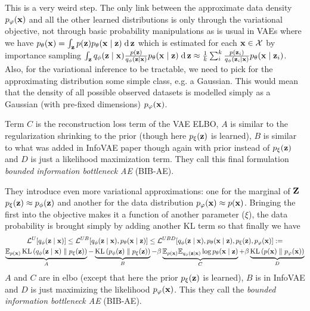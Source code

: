 \begin{notebox}
This is a very weird step. The only link between the approximate data density $p_\varphi(\mathbf{x})$ and all the other learned distributions is only through the variational objective, not through basic probability manipulations as is usual in VAEs where we have $p_\theta(\mathbf{x}) = \int_{\mathbf{z}} p(\mathbf{z}) p_\theta( \mathbf{x} \mid \mathbf{z}) \; \text{d} \, \mathbf{z}$ which is estimated for each $\mathbf{x} \in \mathcal{X}$ by importance sampling $\int_{\mathbf{z}} q_\phi( \mathbf{z} \mid \mathbf{x}) \frac{p(\mathbf{z})}{q_\phi( \mathbf{z} \mid \mathbf{x})} p_\theta( \mathbf{x} \mid \mathbf{z}) \; \text{d} \, \mathbf{z} \approx \frac{1}{k} \sum_i^k \frac{p(\mathbf{z}_i)}{q_\phi(\mathbf{z}_i \mid \mathbf{x})} p_\theta(\mathbf{x} \mid \mathbf{z}_i)$.
Also, for the variational inference to be tractable, we need to pick for the approximating distribution some simple class, e.g. a Gaussian. This would mean that the density of all possible observed datasets is modelled simply as a Gaussian (with pre-fixed dimensions) $p_\varphi(\mathbf{x})$.
\end{notebox}

Term $C$ is the reconstruction loss term of the VAE ELBO, $A$ is similar to the regularization shrinking to the prior (though here $p_\xi(\mathbf{z})$ is learned), $B$ is similar to what was added in InfoVAE paper \parencite{zhaoInfoVAEInformationMaximizing2017} though again with prior instead of $p_\xi(\mathbf{z})$ and $D$ is just a likelihood maximization term.
They call this final formulation \emph{bounded information bottleneck AE} (BIB-AE).


\begin{notebox}
\tldr They introduce even more variational approximations: one for the marginal of $\mathbf{Z}$ $p_\xi(\mathbf{z}) \approx p_\phi(\mathbf{z})$ and another for the data distribution $p_\varphi(\mathbf{x}) \approx p(\mathbf{x})$.
Bringing the first into the objective makes it a function of another parameter ($\xi$), the data probability is brought simply by adding another KL term so that finally we have 
\begin{gather}
\mathcal{L}^{U}[q_\phi( \mathbf{z} \mid \mathbf{x})] \leq \mathcal{L}^{UB}[q_\phi( \mathbf{z} \mid \mathbf{x}), p_\theta( \mathbf{x} \mid \mathbf{z})] \leq \mathcal{L}^{UBD}[q_\phi( \mathbf{z} \mid \mathbf{x}), p_\theta( \mathbf{x} \mid \mathbf{z}), p_\xi(\mathbf{z}), p_\varphi(\mathbf{x})] := \nonumber \\
\underbrace{\mathbb{E}_{p(\mathbf{x})} \operatorname*{KL} \left( q_\phi( \mathbf{z} \mid \mathbf{x}) \parallel p_\xi(\mathbf{z}) \right)}_A - \underbrace{\operatorname*{KL} \left( p_\phi(\mathbf{z}) \parallel p_\xi(\mathbf{z}) \right)}_B
- \beta \underbrace{\mathbb{E}_{p(\mathbf{x})} \mathbb{E}_{q_\phi( \mathbf{z} \mid \mathbf{x})} \log p_\theta( \mathbf{x} \mid \mathbf{z})}_C 
+ \beta \underbrace{\operatorname*{KL} \left( p(\mathbf{x}) \parallel p_\varphi(\mathbf{x}) \right)}_D
\nonumber
\end{gather}
$A$ and $C$ are in elbo (except that here the prior $p_\xi(\mathbf{z})$ is learned), $B$ is in InfoVAE and $D$ is just maximizing the likelihood $p_\varphi(\mathbf{x})$.
This they call the \emph{bounded information bottleneck AE} (BIB-AE).
\end{notebox}

